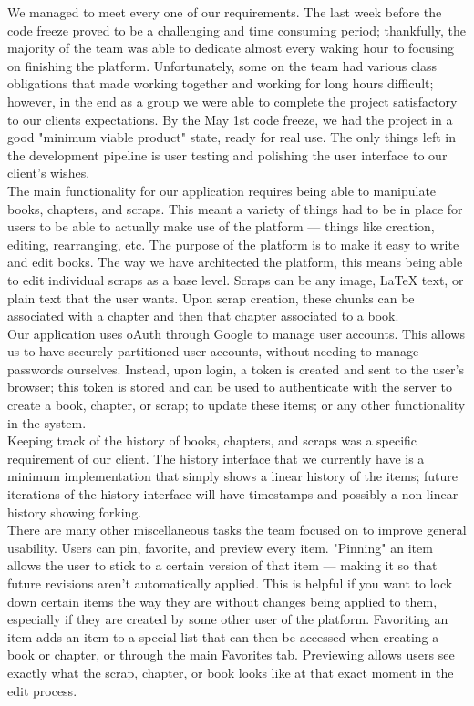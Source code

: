 \documentclass[onecolumn, draftclsnofoot,10pt, compsoc]{IEEEtran}
\begin{document}
\noindent We managed to meet every one of our requirements.
The last week before the code freeze proved to be a challenging and time
consuming period; thankfully, the majority of the team was able to dedicate almost every waking hour to focusing
on finishing the platform. Unfortunately, some on the team had various class obligations that made working
together and working for long hours difficult; however, in the end as a group we
were able to complete the project satisfactory to our clients expectations.
By the May 1st code freeze, we had the project in a good "minimum viable product" state, ready for real use.
The only things left in the development pipeline is user testing and polishing the user interface
to our client's wishes. \\

\noindent The main functionality for our application requires being able to manipulate books,
chapters, and scraps. This meant a variety of things had to be in place for users to be able to
actually make use of the platform --- things like creation, editing, rearranging, etc.
The purpose of the platform is to make it easy to write and edit books.
The way we have architected the platform, this means being able to edit individual scraps as a base level.
Scraps can be any image, LaTeX text, or plain text that the user wants. Upon scrap creation,
these chunks can be associated with a chapter and then that chapter associated to a book. \\

\noindent Our application uses oAuth through Google to manage user accounts. This allows
us to have securely partitioned user accounts, without needing to manage passwords ourselves.
Instead, upon login, a token is created and sent to the user's browser; this token is stored
and can be used to authenticate with the server to create a book, chapter, or scrap; to update
these items; or any other functionality in the system. \\

\noindent Keeping track of the history of books, chapters, and scraps was a specific
requirement of our client. The history interface that we currently have is a minimum implementation
that simply shows a linear history of the items; future iterations of the history interface
will have timestamps and possibly a non-linear history showing forking. \\

\noindent There are many other miscellaneous tasks the team focused on to improve general usability.
Users can pin, favorite, and preview every item. "Pinning" an item allows the user to stick to a certain
version of that item --- making it so that future revisions aren't automatically applied. This
is helpful if you want to lock down certain items the way they are without changes being applied to them,
especially if they are created by some other user of the platform. Favoriting an item adds an item to
a special list that can then be accessed when creating a book or chapter, or through the main Favorites tab.
Previewing allows users see exactly what the scrap, chapter, or book looks like at that exact moment
in the edit process. \\
\end{document}
